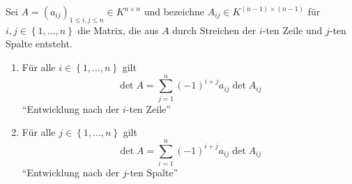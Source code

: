 \documentclass[../../main.tex]{subfiles}
\begin{document}
\begin{sat}\label{9.2.1}
Sei $A = (a_{ij})_{1\le i,j\le n}\in K^{n\times n}$ und bezeichne $A_{ij}\in K^{(n-1)\times (n-1)}$ für $i,j\in \left\{1,\ldots,n\right\}$ die Matrix, die aus $A$ durch Streichen der $i$-ten Zeile und $j$-ten Spalte entsteht. 
\begin{enumerate}[\rm(a)]
\item Für alle $i\in \left\{1,\ldots,n\right\}$ gilt
\[\det A = \sum_{j = 1}^{n}(-1)^{i+j}a_{ij} \det A_{ij}\]
"`Entwicklung nach der $i$-ten Zeile"'
\item Für alle $j\in \left\{1,\ldots,n\right\}$ gilt
\[\det A = \sum_{i = 1}^{n}(-1)^{i+j}a_{ij} \det A_{ij}\]
"`Entwicklung nach der $j$-ten Spalte"'
\end{enumerate}
\end{sat}
\end{document}
